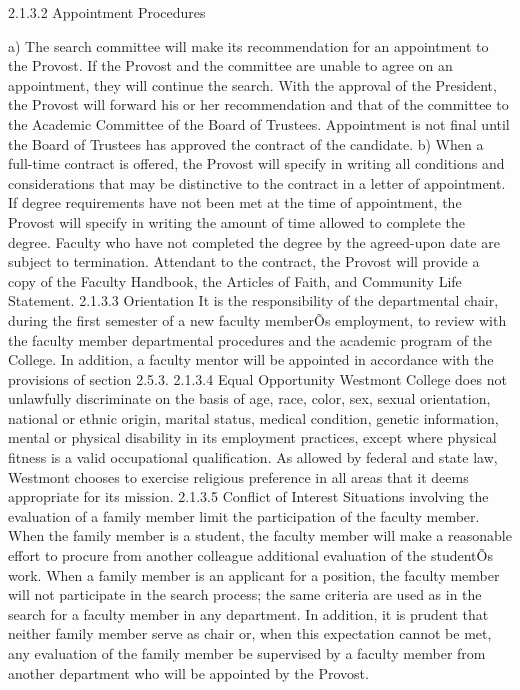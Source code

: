\documentclass[letterpaper, 11pt]{article}
\begin{document}
	2.1.3.2 Appointment Procedures

	a) The search committee will make its recommendation for an appointment to the Provost.  If the Provost and the committee are unable to agree on an appointment, they will continue the search.  With the approval of the President, the Provost will forward his or her recommendation and that of the committee to the Academic Committee of the Board of Trustees.  Appointment is not final until the Board of Trustees has approved the contract of the candidate.
	b) When a full-time contract is offered, the Provost will specify in writing all conditions and considerations that may be distinctive to the contract in a letter of appointment.  If degree requirements have not been met at the time of appointment, the Provost will specify in writing the amount of time allowed to complete the degree.  Faculty who have not completed the degree by the agreed-upon date are subject to termination.  Attendant to the contract, the Provost will provide a copy of the Faculty Handbook, the Articles of Faith, and Community Life Statement.
	2.1.3.3 Orientation
	It is the responsibility of the departmental chair, during the first semester of a new faculty memberÕs employment, to review with the faculty member departmental procedures and the academic program of the College.  In addition, a faculty mentor will be appointed in accordance with the provisions of section 2.5.3.
	2.1.3.4 Equal Opportunity
	Westmont College does not unlawfully discriminate on the basis of age, race, color, sex, sexual orientation, national or ethnic origin, marital status, medical condition, genetic information, mental or physical disability in its employment practices, except where physical fitness is a valid occupational qualification. As allowed by federal and state law, Westmont chooses to exercise religious preference in all areas that it deems appropriate for its mission.
	2.1.3.5 Conflict of Interest
	Situations involving the evaluation of a family member limit the participation of the faculty member.  When the family member is a student, the faculty member will make a reasonable effort to procure from another colleague additional evaluation of the studentÕs work.  When a family member is an applicant for a position, the faculty member will not participate in the search process; the same criteria are used as in the search for a faculty member in any department.  In addition, it is prudent that neither family member serve as chair or, when this expectation cannot be met, any evaluation of the family member be supervised by a faculty member from another department who will be appointed by the Provost.
\end{document}
